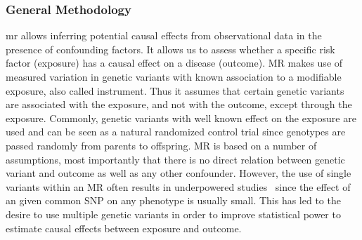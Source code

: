 \subsubsection{General Methodology}
\label{ssub:General_Methedology}

\acrfull{mr} allows  inferring potential causal effects from observational data in the presence of confounding factors. 
It allows us to assess whether a specific risk factor (exposure) has a causal effect on a disease (outcome).
MR makes use of measured variation in genetic variants with known association to a modifiable exposure, also called instrument.
Thus it assumes that certain genetic variants are associated with the exposure, and not with the outcome, except through the exposure.
Commonly, genetic variants with well known effect on the exposure are used and can be seen as a natural randomized control trial since genotypes are passed randomly from parents to offspring.
MR is based on a number of assumptions, most importantly that there is no direct relation between genetic variant and outcome as well as any other confounder.
However, the use of single variants within an MR often results in underpowered studies~\cite{Bowden2015} since the effect of an given common SNP on any phenotype is usually small.
This has led to the desire to use multiple genetic variants in order to improve statistical power to estimate causal effects between exposure and outcome.

